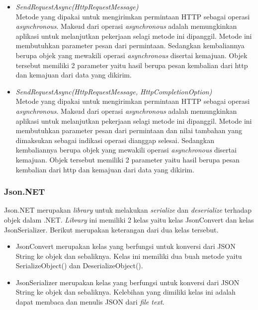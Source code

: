 \begin{itemize}
	\item \textit{SendRequestAsync(HttpRequestMessage)} \\
	Metode yang dipakai untuk mengirimkan permintaan HTTP sebagai operasi \textit{asynchronous}. Maksud dari operasi \textit{asynchronous} adalah memungkinkan aplikasi untuk melanjutkan pekerjaan selagi metode ini dipanggil\footnotemark[2]. Metode ini membutuhkan parameter pesan dari permintaan. Sedangkan kembaliannya berupa objek yang mewakili operasi \textit{asynchronous} disertai kemajuan. Objek tersebut memiliki 2 parameter yaitu hasil berupa pesan kembalian dari http dan kemajuan dari data yang dikirim.
	\item \textit{SendRequestAsync(HttpRequestMessage, HttpCompletionOption)} \\
	Metode yang dipakai untuk mengirimkan permintaan HTTP sebagai operasi \textit{asynchronous}. Maksud dari operasi \textit{asynchronous} adalah memungkinkan aplikasi untuk melanjutkan pekerjaan selagi metode ini dipanggil\footnotemark[2]. Metode ini membutuhkan parameter pesan dari permintaan dan nilai tambahan yang dimaksukan sebagai indikasi operasi dianggap selesai. Sedangkan kembaliannya berupa objek yang mewakili operasi \textit{asynchronous} disertai kemajuan. Objek tersebut memiliki 2 parameter yaitu hasil berupa pesan kembalian dari http dan kemajuan dari data yang dikirim.
\end{itemize}


\subsubsection{Json.NET}
\label{subsubsec:Json.NET}
\hspace{0.5cm} Json.NET merupakan \textit{library} untuk melakukan \textit{serialize} dan \textit{deserialize} terhadap objek dalam .NET. \textit{Library} ini memiliki 2 kelas yaitu kelas JsonConvert dan kelas JsonSerializer. Berikut merupakan keterangan dari dua kelas tersebut.
\begin{itemize}
	\item JsonConvert merupakan kelas yang berfungsi untuk konversi dari JSON String ke objek dan sebaliknya. Kelas ini memiliki dua buah metode yaitu SerializeObject() dan DeserializeObject().
	\item JsonSerializer merupakan kelas yang berfungsi untuk konversi dari JSON String ke objek dan sebaliknya. Kelebihan yang dimiliki kelas ini adalah dapat membaca dan menulis JSON dari \textit{file text}.
\end{itemize}

